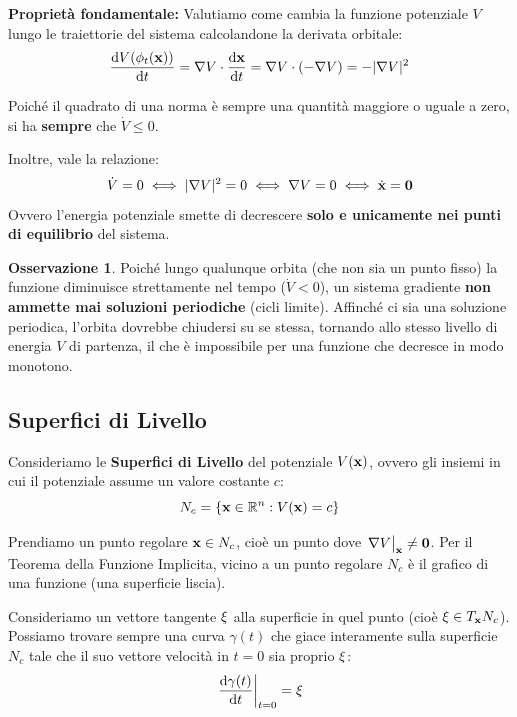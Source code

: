 \documentclass[openany]{book}
\theoremstyle{definition}
\newtheorem*{osservazione}{Osservazione}
\theoremstyle{remark}
\newcommand{\R}{\mathbb{R}}
\begin{document}
\textbf{Proprietà fondamentale:} Valutiamo come cambia la funzione potenziale $V$ lungo le traiettorie del sistema calcolandone la derivata orbitale:
\begin{equation}
    \dv{V(\phi_t(\vb{x}))}{t} = \nabla V \cdot \dv{\vb{x}}{t} = \nabla V \cdot (-\nabla V) = -|\nabla V|^2
\end{equation}

Poiché il quadrato di una norma è sempre una quantità maggiore o uguale a zero, si ha \textbf{sempre} che $\dot{V} \le 0$.

Inoltre, vale la relazione:
\begin{equation*}
    \dot{V} = 0 \iff |\nabla V|^2 = 0 \iff \nabla V = 0 \iff \dot{\vb{x}} = \vb{0}
\end{equation*}
Ovvero l'energia potenziale smette di decrescere \textbf{solo e unicamente nei punti di equilibrio} del sistema.

\begin{osservazione}
Poiché lungo qualunque orbita (che non sia un punto fisso) la funzione diminuisce strettamente nel tempo ($\dot{V} < 0$), un sistema gradiente \textbf{non ammette mai soluzioni periodiche} (cicli limite). Affinché ci sia una soluzione periodica, l'orbita dovrebbe chiudersi su se stessa, tornando allo stesso livello di energia $V$ di partenza, il che è impossibile per una funzione che decresce in modo monotono.
\end{osservazione}


\subsection*{Superfici di Livello}

Consideriamo le \textbf{Superfici di Livello} del potenziale $V(\vb{x})$, ovvero gli insiemi in cui il potenziale assume un valore costante $c$:
\begin{equation*}
    N_c = \{ \vb{x} \in \R^n : V(\vb{x}) = c \}
\end{equation*}

Prendiamo un punto regolare $\vb{x} \in N_c$, cioè un punto dove $\eval{\nabla V}_{\vb{x}} \neq \vb{0}$. Per il Teorema della Funzione Implicita, vicino a un punto regolare $N_c$ è il grafico di una funzione (una superficie liscia).

Consideriamo un vettore tangente $\vb{\xi}$ alla superficie in quel punto (cioè $\vb{\xi} \in T_{\vb{x}} N_c$). Possiamo trovare sempre una curva $\gamma(t)$ che giace interamente sulla superficie $N_c$ tale che il suo vettore velocità in $t=0$ sia proprio $\vb{\xi}$:
\begin{equation*}
    \eval{ \dv{\gamma(t)}{t} }_{t=0} = \vb{\xi}
\end{equation*}
\end{document}

